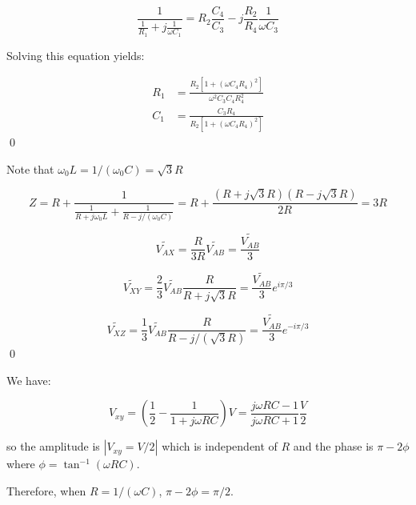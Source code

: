 \documentclass[12pt]{article}
\begin{document}
\begin{equation}
    \frac{1}{\frac{1}{R_{1}} + j \frac{1}{\omega C_{1}}} = R_{2} \frac{C_{4}}{C_{3}} - j \frac{R_{2}}{R_{4}} \frac{1}{\omega C_{3}}
\end{equation}

Solving this equation yields:

\begin{equation}
\begin{split}
    R_{1} &= \frac{R_{2}\left[ 1 + (\omega C_{4} R_{4})^{2} \right]}{\omega^{2} C_{3} C_{4} R_{4}^{2}} \\
    C_{1} &= \frac{C_{3} R_{4}}{R_{2}\left[ 1 + (\omega C_{4} R_{4})^{2} \right]}
\end{split}
\end{equation}
\qed



Note that $\omega_{0} L = 1/(\omega_{0} C) = \sqrt{3}R$

\begin{equation}
    Z = R + \frac{1}{\frac{1}{R + j \omega_{0} L} + \frac{1}{R - j/(\omega_{0} C)}} = R + \frac{(R + j\sqrt{3}R)(R - j\sqrt{3}R)}{2R} = 3R
\end{equation}


\begin{equation}
    \tilde{V_{AX}} = \frac{R}{3R} \tilde{V_{AB}} = \frac{\tilde{V_{AB}}}{3}
\end{equation}

\begin{equation}
    \tilde{V_{XY}} = \frac{2}{3} \tilde{V_{AB}} \frac{R}{R + j\sqrt{3}R} = \frac{\tilde{V_{AB}}}{3} e^{i\pi/3}
\end{equation}

\begin{equation}
    \tilde{V_{XZ}} = \frac{1}{3} \tilde{V_{AB}} \frac{R}{R - j/(\sqrt{3}R)} = \frac{\tilde{V_{AB}}}{3} e^{-i\pi/3}
\end{equation}
\qed


We have:

\begin{equation}
    V_{xy} = \left( \frac{1}{2} - \frac{1}{1 + j\omega R C} \right) V = \frac{j\omega R C - 1}{j\omega R C + 1} \frac{V}{2}
\end{equation}

so the amplitude is $\left\lvert V_{xy} = V/2 \right\rvert$ which is independent of $R$ and the phase is $\pi - 2\phi$ where $\phi = \tan^{-1}{(\omega R C)}$.

Therefore, when $R = 1/(\omega C)$, $\pi - 2\phi = \pi/2$.
\end{document}
